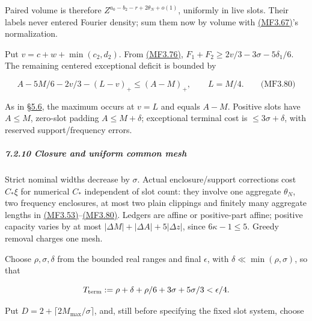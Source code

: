 Paired volume is therefore \(Z^{a_0-b_2-r+2\theta_N+o(1)}\), uniformly in live slots. Their labels never entered Fourier density; sum them now by volume with \protect\hyperlink{mf:eq:B3.67}{(MF3.67)}'s normalization.

Put \(v=c+w+\min(c_2,d_2)\). From \protect\hyperlink{mf:eq:B3.76}{(MF3.76)}, \(F_1+F_2\ge2v/3-3\sigma-5\delta_1/6\). The remaining centered exceptional deficit is bounded by

\hypertarget{mf:eq:B3.80}{}

\label{mf:eq:B3.80}

\[
A-5M/6-2v/3-(L-v)_+\le(A-M)_+,
\qquad L=M/4.
\qquad\text{(MF3.80)}
\]

As in §\protect\hyperlink{cf:sec:D.6}{5.6}, the maximum occurs at \(v=L\) and equals \(A-M\). Positive slots have \(A\le M\), zero-slot padding \(A\le M+\delta\); exceptional terminal cost is \(\le3\sigma+\delta\), with reserved support/frequency errors.

\hypertarget{closure-and-uniform-common-mesh}{}

\label{closure-and-uniform-common-mesh}

\hypertarget{closure-and-uniform-common-mesh-heading-2}{%
\subparagraph{7.2.10 Closure and uniform common mesh}}

Strict nominal widths decrease by \(\sigma\). Actual enclosure/support corrections cost \(C_*\xi\) for numerical \(C_*\) independent of slot count: they involve one aggregate \(\theta_N\), two frequency enclosures, at most two plain clippings and finitely many aggregate lengths in \protect\hyperlink{mf:eq:B3.53}{(MF3.53)}--\protect\hyperlink{mf:eq:B3.80}{(MF3.80)}. Ledgers are affine or positive-part affine; positive capacity varies by at most \(|\Delta M|+|\Delta A|+5|\Delta z|\), since \(6\kappa-1\le5\). Greedy removal charges one mesh.

Choose \(\rho,\sigma,\delta\) from the bounded real ranges and final \(\epsilon\), with \(\delta\ll\min(\rho,\sigma)\), so that

\[
T_{\rm term}:=\rho+\delta+\rho/6+3\sigma+5\sigma/3<\epsilon/4.
\]

Put \(D=2+\lceil2M_{\max}/\sigma\rceil\), and, still before specifying the fixed slot system, choose

\hypertarget{mf:eq:B3.81}{}

\label{mf:eq:B3.81}

\par\noindent{}\par

